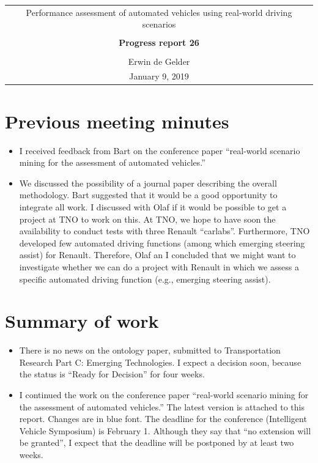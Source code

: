 \documentclass[10pt,final,a4paper,oneside,onecolumn]{article}
\newcommand{\progressreportnumber}{26}
\renewcommand{\author}{Erwin de Gelder}
\renewcommand{\date}{January 9, 2019}
\renewcommand{\title}{Performance assessment of automated vehicles using real-world driving scenarios}
\begin{document}
	
\begin{center}
	\begin{tabular}{c}
		\title \\ \\
		\textbf{\huge Progress report \progressreportnumber} \\ \\
		\author \\ 
		\date
	\end{tabular}
\end{center}

\section{Previous meeting minutes}

\begin{itemize}
	\item I received feedback from Bart on the conference paper ``real-world scenario mining for the assessment of automated vehicles.''
	\item We discussed the possibility of a journal paper describing the overall methodology. Bart suggested that it would be a good opportunity to integrate all work. I discussed with Olaf if it would be possible to get a project at TNO to work on this. At TNO, we hope to have soon the availability to conduct tests with three Renault ``carlabs''. Furthermore, TNO developed few automated driving functions (among which emerging steering assist) for Renault. Therefore, Olaf an I concluded that we might want to investigate whether we can do a project with Renault in which we assess a specific automated driving function (e.g., emerging steering assist).
\end{itemize}

\section{Summary of work}

\begin{itemize}
	\item There is no news on the ontology paper, submitted to Transportation Research Part C: Emerging Technologies. I expect a decision soon, because the status is ``Ready for Decision'' for four weeks.
	\item I continued the work on the conference paper ``real-world scenario mining for the assessment of automated vehicles.'' The latest version is attached to this report. Changes are in blue font. The deadline for the conference (Intelligent Vehicle Symposium) is February 1. Although they say that ``no extension will be granted'', I expect that the deadline will be postponed by at least two weeks.
\end{itemize}
\end{document}
